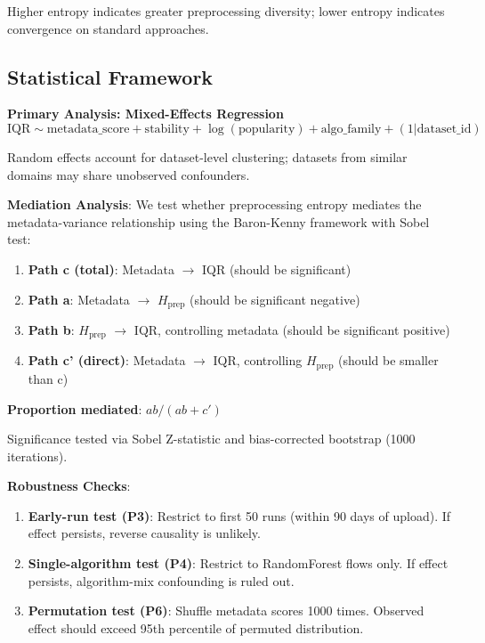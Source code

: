 Higher entropy indicates greater preprocessing diversity; lower entropy indicates convergence on standard approaches.

\subsection{Statistical Framework}

\textbf{Primary Analysis: Mixed-Effects Regression}
\begin{equation}
\text{IQR} \sim \text{metadata\_score} + \text{stability} + \log(\text{popularity}) + \text{algo\_family} + (1|\text{dataset\_id})
\end{equation}

Random effects account for dataset-level clustering; datasets from similar domains may share unobserved confounders.

\textbf{Mediation Analysis}: We test whether preprocessing entropy mediates the metadata-variance relationship using the Baron-Kenny framework with Sobel test:

\begin{enumerate}
    \item \textbf{Path c (total)}: Metadata $\to$ IQR (should be significant)
    \item \textbf{Path a}: Metadata $\to$ $H_{\text{prep}}$ (should be significant negative)
    \item \textbf{Path b}: $H_{\text{prep}}$ $\to$ IQR, controlling metadata (should be significant positive)
    \item \textbf{Path c' (direct)}: Metadata $\to$ IQR, controlling $H_{\text{prep}}$ (should be smaller than c)
\end{enumerate}

\textbf{Proportion mediated}: $ab/(ab + c')$

Significance tested via Sobel Z-statistic and bias-corrected bootstrap (1000 iterations).

\textbf{Robustness Checks}:
\begin{enumerate}
    \item \textbf{Early-run test (P3)}: Restrict to first 50 runs (within 90 days of upload). If effect persists, reverse causality is unlikely.
    \item \textbf{Single-algorithm test (P4)}: Restrict to RandomForest flows only. If effect persists, algorithm-mix confounding is ruled out.
    \item \textbf{Permutation test (P6)}: Shuffle metadata scores 1000 times. Observed effect should exceed 95th percentile of permuted distribution.
\end{enumerate}


